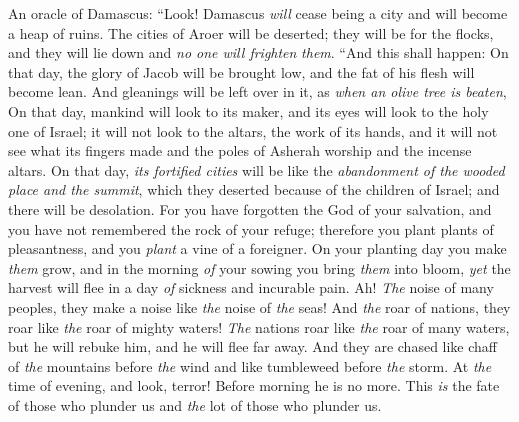 \begin{biblechapter} %
 An oracle of Damascus:
\verse “Look! Damascus \textit{will} cease being a city 
and will become a heap of ruins.
\verse The cities of Aroer will be deserted; 
they will be for the flocks, 
and they will lie down and \textit{no one will frighten} \textit{them}.
\verse “And this shall happen:
\verse On that day, the glory of Jacob will be brought low, 
and the fat of his flesh will become lean.
\verse And gleanings will be left over in it, as \textit{when an olive tree is beaten},
\verse On that day, mankind will look to its maker, 
and its eyes will look to the holy one of Israel;
\verse it will not look to the altars, 
the work of its hands, 
and it will not see what its fingers made 
and the poles of Asherah worship and the incense altars.
\verse On that day, \textit{its fortified cities} will be like the \textit{abandonment of the wooded place and the summit}, which they deserted because of the children of Israel; and there will be desolation.
\verse For you have forgotten the God of your salvation, 
and you have not remembered the rock of your refuge; 
therefore you plant plants of pleasantness, 
and you \textit{plant} a vine of a foreigner.
\verse On your planting day you make \textit{them} grow, 
and in the morning \textit{of} your sowing you bring \textit{them} into bloom, 
\textit{yet} the harvest will flee in a day \textit{of} sickness and incurable pain.
 Ah! \textit{The} noise of many peoples, they make a noise like \textit{the} noise of \textit{the} seas! 
And \textit{the} roar of nations, they roar like \textit{the} roar of mighty waters!
\verse \textit{The} nations roar like \textit{the} roar of many waters, 
but he will rebuke him, and he will flee far away. 
And they are chased like chaff of \textit{the} mountains before \textit{the} wind 
and like tumbleweed before \textit{the} storm.
\verse At \textit{the} time of evening, and look, terror! 
Before morning he is no more. 
This \textit{is} the fate of those who plunder us 
and \textit{the} lot of those who plunder us.
\end{biblechapter}

